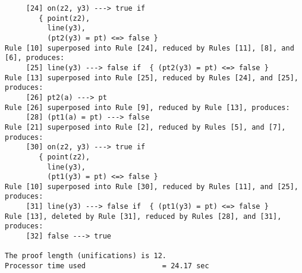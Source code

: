 \begin{verbatim}
     [24] on(z2, y3) ---> true if 
        { point(z2),
          line(y3),
          (pt2(y3) = pt) <=> false } 
Rule [10] superposed into Rule [24], reduced by Rules [11], [8], and [6], produces:
     [25] line(y3) ---> false if  { (pt2(y3) = pt) <=> false } 
Rule [13] superposed into Rule [25], reduced by Rules [24], and [25], produces:
     [26] pt2(a) ---> pt
Rule [26] superposed into Rule [9], reduced by Rule [13], produces:
     [28] (pt1(a) = pt) ---> false
Rule [21] superposed into Rule [2], reduced by Rules [5], and [7], produces:
     [30] on(z2, y3) ---> true if 
        { point(z2),
          line(y3),
          (pt1(y3) = pt) <=> false } 
Rule [10] superposed into Rule [30], reduced by Rules [11], and [25], produces:
     [31] line(y3) ---> false if  { (pt1(y3) = pt) <=> false } 
Rule [13], deleted by Rule [31], reduced by Rules [28], and [31], produces:
     [32] false ---> true

The proof length (unifications) is 12.
Processor time used                  = 24.17 sec
\end{verbatim}
\rm
\normalsize
